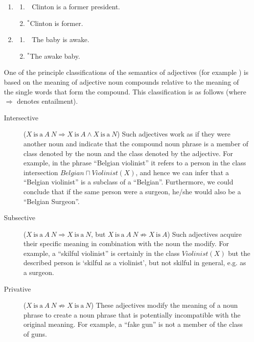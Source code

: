 \documentclass[11pt]{article}
\begin{document}
\begin{enumerate}
\item \begin{enumerate}	
\item \ \,Clinton is a former president.
\item $^\ast$Clinton is former.
\end{enumerate}
\label{ex:technical}
\item \begin{enumerate}	
        \item \ \,The baby is awake. \label{ex:awake}
\item $^\ast$The awake baby.
\end{enumerate}
\label{ex:baby}
\end{enumerate}

One of the principle classifications of the semantics of adjectives (for example \cite{partee2003there,bouillon1999description,morzycki2013modification}) is based on the meaning of adjective noun compounds relative to the meaning of the single words that form the compound. This classification is as follows (where $\Rightarrow$ denotes entailment).

\begin{description}
\item[Intersective] ($X\mathrm{~is~a~}A~N \Rightarrow X\mathrm{~is~}A \wedge  X\mathrm{~is~a~}N$) 
Such adjectives work as if they were another noun and indicate that the compound 
noun phrase is a member of class denoted by the noun and the class denoted by the adjective. For example, in the phrase ``Belgian violinist'' it refers to a 
person in the class intersection $Belgian \sqcap Violinist(X)$, and hence we 
can infer that a ``Belgian violinist'' is a subclass of a ``Belgian''.  Furthermore,
we could conclude that if the same person were a surgeon, he/she would also
be a ``Belgian Surgeon''.

\item[Subsective] ($X\mathrm{~is~a~}A~N \Rightarrow X\mathrm{~is~a~}N$, but $X\mathrm{~is~a~}A~N \not\Rightarrow X\mathrm{~is~}A$) Such adjectives acquire their specific meaning in combination with the noun the modify. For example, a ``skilful 
violinist'' is certainly in the class $Violinist(X)$ but the described person is `skilful as a violinist', but not skilful in general, e.g. as a surgeon.

\item[Privative] ($X\mathrm{~is~a~}A~N \not\Rightarrow X\mathrm{~is~a~}N$) 
These adjectives modify the meaning of a noun phrase to create a noun phrase 
that is potentially incompatible with the original meaning. For example, a 
``fake gun'' is not a member of the class of guns.
\end{description}
\end{document}
